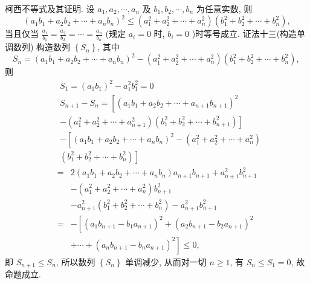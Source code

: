 柯西不等式及其证明.
设 $a_1, a_2, \cdots, a_n$ 及 $b_1, b_2, \cdots, b_n$ 为任意实数, 则
$$
\left(a_1 b_1+a_2 b_2+\cdots+a_n b_n\right)^2 \leqslant\left(a_1^2+a_2^2+\cdots+a_n^2\right)\left(b_1^2+b_2^2+\cdots+b_n^2\right),
$$
当且仅当 $\frac{a_1}{b_1}=\frac{a_2}{b_2}=\cdots=\frac{a_n}{b_n}$ (规定 $a_i=0$ 时, $b_i=0$ )时等号成立.
证法十三(构造单调数列)
构造数列 $\left\{S_n\right\}$, 其中
$$
S_n=\left(a_1 b_1+a_2 b_2+\cdots+a_n b_n\right)^2-\left(a_1^2+a_2^2+\cdots+a_n^2\right)\left(b_1^2+b_2^2+\cdots+b_n^2\right) \text {, }
$$
则
$$
\begin{aligned}
& S_1=\left(a_1 b_1\right)^2-a_1^2 b_1^2=0 \\
& S_{n+1}-S_n= {\left[\left(a_1 b_1+a_2 b_2+\cdots+a_{n+1} b_{n+1}\right)^2\right.} \\
&\left.-\left(a_1^2+a_2^2+\cdots+a_{n+1}^2\right)\left(b_1^2+b_2^2+\cdots+b_{n+1}^2\right)\right] \\
&-\left[\left(a_1 b_1+a_2 b_2+\cdots+a_n b_n\right)^2-\left(a_1^2+a_2^2+\cdots+a_n^2\right)\right. \\
&\left.\left(b_1^2+b_2^2+\cdots+b_n^2\right)\right]
\end{aligned}
$$
$$
\begin{aligned}
= & 2\left(a_1 b_1+a_2 b_2+\cdots+a_n b_n\right) a_{n+1} b_{n+1}+a_{n+1}^2 b_{n+1}^2 \\
& -\left(a_1^2+a_2^2+\cdots+a_n^2\right) b_{n+1}^2 \\
& -a_{n+1}^2\left(b_1^2+b_2^2+\cdots+b_n^2\right)-a_{n+1}^2 b_{n+1}^2 \\
= & -\left[\left(a_1 b_{n+1}-b_1 a_{n+1}\right)^2+\left(a_2 b_{n+1}-b_2 a_{n+1}\right)^2\right. \\
& \left.+\cdots+\left(a_n b_{n+1}-b_n a_{n+1}\right)^2\right] \leqslant 0,
\end{aligned}
$$
即 $S_{n+1} \leqslant S_n$, 所以数列 $\left\{S_n\right\}$ 单调减少, 从而对一切 $n \geqslant 1$, 有 $S_n \leqslant S_1=0$, 故命题成立.



